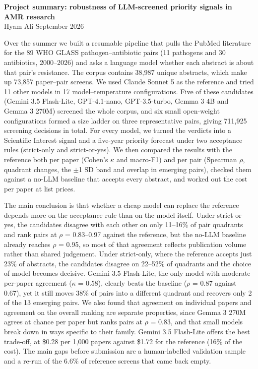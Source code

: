 \documentclass[11pt,a4paper]{article}
\begin{document}
{\large\bfseries Project summary: robustness of LLM-screened priority signals in AMR research}\\[2pt]
{\small Hyam Ali \textperiodcentered{} September 2026}

Over the summer we built a resumable pipeline that pulls the PubMed literature for the 89 WHO GLASS pathogen--antibiotic pairs (11 pathogens and 30 antibiotics, 2000--2026) and asks a language model whether each abstract is about that pair's resistance. The corpus contains 38,987 unique abstracts, which make up 73,857 paper--pair screens. We used Claude Sonnet 5 as the reference and tried 11 other models in 17 model--temperature configurations. Five of these candidates (Gemini 3.5 Flash-Lite, GPT-4.1-nano, GPT-3.5-turbo, Gemma 3 4B and Gemma 3 270M) screened the whole corpus, and six small open-weight configurations formed a size ladder on three representative pairs, giving 711,925 screening decisions in total. For every model, we turned the verdicts into a Scientific Interest signal and a five-year priority forecast under two acceptance rules (strict-only and strict-or-yes). We then compared the results with the reference both per paper (Cohen's $\kappa$ and macro-F1) and per pair (Spearman $\rho$, quadrant changes, the $\pm$1 SD band and overlap in emerging pairs), checked them against a no-LLM baseline that accepts every abstract, and worked out the cost per paper at list prices.

The main conclusion is that whether a cheap model can replace the reference depends more on the acceptance rule than on the model itself. Under strict-or-yes, the candidates disagree with each other on only 11--16\% of pair quadrants and rank pairs at $\rho$ = 0.83--0.97 against the reference, but the no-LLM baseline already reaches $\rho$ = 0.95, so most of that agreement reflects publication volume rather than shared judgement. Under strict-only, where the reference accepts just 23\% of abstracts, the candidates disagree on 22--52\% of quadrants and the choice of model becomes decisive. Gemini 3.5 Flash-Lite, the only model with moderate per-paper agreement ($\kappa$ = 0.58), clearly beats the baseline ($\rho$ = 0.87 against 0.67), yet it still moves 38\% of pairs into a different quadrant and recovers only 2 of the 13 emerging pairs. We also found that agreement on individual papers and agreement on the overall ranking are separate properties, since Gemma 3 270M agrees at chance per paper but ranks pairs at $\rho$ = 0.83, and that small models break down in ways specific to their family. Gemini 3.5 Flash-Lite offers the best trade-off, at \$0.28 per 1,000 papers against \$1.72 for the reference (16\% of the cost). The main gaps before submission are a human-labelled validation sample and a re-run of the 6.6\% of reference screens that came back empty.
\end{document}
